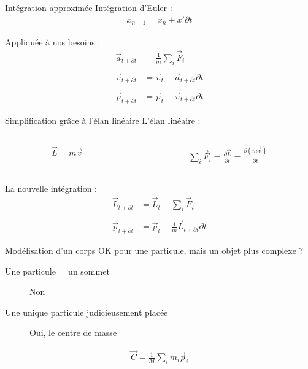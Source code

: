 \documentclass{beamer}
\newcommand{\deriv}{\partial \!}
\begin{document}
\begin{frame}{Intégration approximée}
  Intégration d'Euler :
  \begin{align*}
    x_{n+1} = x_{n} + x' \deriv t
  \end{align*}

  \vfill

  Appliquée à nos besoins :
  \begin{align*}
    \vec{a}_{t + \deriv t} &= \frac{1}{m} \sum_i \vec{F}_i \\ \\
    \vec{v}_{t + \deriv t} &= \vec{v}_t + \vec{a}_{t + \deriv t} \deriv t \\ \\
    \vec{p}_{t + \deriv t} &= \vec{p}_t + \vec{v}_{t + \deriv t} \deriv t
  \end{align*}
\end{frame}

\begin{frame}{Simplification grâce à l'élan linéaire}
  L'élan linéaire :
  \begin{columns}
    \begin{column}{3cm}
      \begin{align*}
        \vec{L} = m \vec{v}
      \end{align*}
    \end{column}
    \begin{column}{3cm}
      \begin{align*}
        \sum_i \vec{F}_i = \frac{\deriv \vec{L}}{\deriv t} = \frac{\deriv (m\vec{v})}{\deriv t}
      \end{align*}
    \end{column}
  \end{columns}

  \vfill

  La nouvelle intégration :
  \begin{align*}
    \vec{L}_{t + \deriv t} &= \vec{L}_t + {\sum_i \vec{F}_i} \\ \\
    \vec{p}_{t + \deriv t} &= \vec{p}_t + \frac{1}{m}\vec{L}_{t + \deriv t} \deriv t
  \end{align*}
\end{frame}

\begin{frame}{Modélisation d'un corps}
  OK pour une particule, mais un objet plus complexe ?
  \begin{description}
  \item[Une particule = un sommet] Non
  \item[Une unique particule judicieusement placée] Oui, le centre de masse
  \end{description}

  \vfill

  \begin{align*}
    \vec{C} = \frac{1}{M} \sum_i m_i \vec{p}_i
  \end{align*}
\end{frame}
\end{document}
